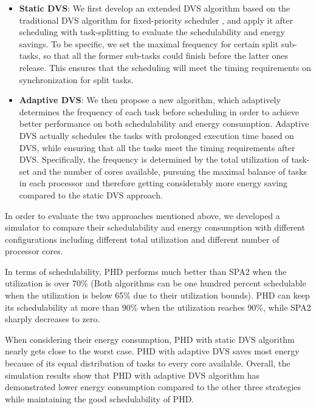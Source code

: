 \documentclass[12pt, journal,compsoc]{IEEEtran}
\begin{document}
\begin{itemize}

\item \textbf{Static DVS}: We first develop an extended DVS algorithm based on the traditional DVS algorithm for fixed-priority scheduler \cite{Pillai:2001:RDV:502034.502044}, and apply it after scheduling with task-splitting to evaluate the schedulability and energy savings. To be specific, we set the maximal frequency for certain split sub-tasks, so that all the former sub-tasks could finish before the latter ones release. This ensures that the scheduling will meet the timing requirements on synchronization for split tasks.

\item \textbf{Adaptive DVS}: We then propose a new algorithm, which adaptively determines the frequency of each task before scheduling in order to achieve better performance on both schedulability and energy consumption. Adaptive DVS actually schedules the tasks with prolonged execution time based on DVS,  while ensuring that all the tasks meet the timing requirements after DVS. Specifically, the frequency is determined by the total utilization of task-set and the number of cores available, pursuing the maximal balance of tasks in each processor and therefore getting considerably more energy saving compared to the static DVS approach.

\end{itemize}

In order to evaluate the two approaches mentioned above, we developed a simulator to compare their schedulability and energy consumption with different configurations including different total utilization and different number of processor cores.

In terms of schedulability, PHD performs much better than SPA2 when the utilization is over 70\% (Both algorithms can be one hundred percent schedulable when the utilization is below 65\% due to their utilization bounds). PHD can keep its schedulability at more than 90\% when the utilization reaches 90\%, while SPA2 sharply decreases to zero.

When considering their energy consumption, PHD with static DVS algorithm nearly gets close to the worst case. PHD with adaptive DVS saves most energy because of its equal distribution of tasks to every core available. Overall, the simulation results show that PHD with adaptive DVS algorithm has demonstrated lower energy consumption compared to the other three strategies while maintaining the good schedulability of PHD.
\end{document}
